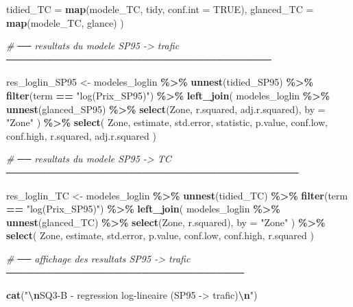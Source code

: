 \documentclass[
]{article}
\newenvironment{Shaded}{\begin{snugshade}}{\end{snugshade}}
\newcommand{\AttributeTok}[1]{\textcolor[rgb]{0.13,0.29,0.53}{#1}}
\newcommand{\CommentTok}[1]{\textcolor[rgb]{0.56,0.35,0.01}{\textit{#1}}}
\newcommand{\ConstantTok}[1]{\textcolor[rgb]{0.56,0.35,0.01}{#1}}
\newcommand{\FunctionTok}[1]{\textcolor[rgb]{0.13,0.29,0.53}{\textbf{#1}}}
\newcommand{\NormalTok}[1]{#1}
\newcommand{\OtherTok}[1]{\textcolor[rgb]{0.56,0.35,0.01}{#1}}
\newcommand{\SpecialCharTok}[1]{\textcolor[rgb]{0.81,0.36,0.00}{\textbf{#1}}}
\newcommand{\StringTok}[1]{\textcolor[rgb]{0.31,0.60,0.02}{#1}}
\begin{document}
\begin{Shaded}
\begin{Highlighting}[]
    \AttributeTok{tidied\_TC  =} \FunctionTok{map}\NormalTok{(modele\_TC, tidy, }\AttributeTok{conf.int =} \ConstantTok{TRUE}\NormalTok{),}
    \AttributeTok{glanced\_TC =} \FunctionTok{map}\NormalTok{(modele\_TC, glance)}
\NormalTok{  )}


\CommentTok{\# ── resultats du modele SP95 {-}\textgreater{} trafic ───────────────────────────────────────}

\NormalTok{res\_loglin\_SP95 }\OtherTok{\textless{}{-}}\NormalTok{ modeles\_loglin }\SpecialCharTok{\%\textgreater{}\%}
  \FunctionTok{unnest}\NormalTok{(tidied\_SP95) }\SpecialCharTok{\%\textgreater{}\%}
  \FunctionTok{filter}\NormalTok{(term }\SpecialCharTok{==} \StringTok{"log(Prix\_SP95)"}\NormalTok{) }\SpecialCharTok{\%\textgreater{}\%}
  \FunctionTok{left\_join}\NormalTok{(}
\NormalTok{    modeles\_loglin }\SpecialCharTok{\%\textgreater{}\%}
      \FunctionTok{unnest}\NormalTok{(glanced\_SP95) }\SpecialCharTok{\%\textgreater{}\%}
      \FunctionTok{select}\NormalTok{(Zone, r.squared, adj.r.squared),}
    \AttributeTok{by =} \StringTok{"Zone"}
\NormalTok{  ) }\SpecialCharTok{\%\textgreater{}\%}
  \FunctionTok{select}\NormalTok{(}
\NormalTok{    Zone, estimate, std.error, statistic, p.value,}
\NormalTok{    conf.low, conf.high, r.squared, adj.r.squared}
\NormalTok{  )}


\CommentTok{\# ── resultats du modele SP95 {-}\textgreater{} TC ───────────────────────────────────────────}

\NormalTok{res\_loglin\_TC }\OtherTok{\textless{}{-}}\NormalTok{ modeles\_loglin }\SpecialCharTok{\%\textgreater{}\%}
  \FunctionTok{unnest}\NormalTok{(tidied\_TC) }\SpecialCharTok{\%\textgreater{}\%}
  \FunctionTok{filter}\NormalTok{(term }\SpecialCharTok{==} \StringTok{"log(Prix\_SP95)"}\NormalTok{) }\SpecialCharTok{\%\textgreater{}\%}
  \FunctionTok{left\_join}\NormalTok{(}
\NormalTok{    modeles\_loglin }\SpecialCharTok{\%\textgreater{}\%}
      \FunctionTok{unnest}\NormalTok{(glanced\_TC) }\SpecialCharTok{\%\textgreater{}\%}
      \FunctionTok{select}\NormalTok{(Zone, r.squared),}
    \AttributeTok{by =} \StringTok{"Zone"}
\NormalTok{  ) }\SpecialCharTok{\%\textgreater{}\%}
  \FunctionTok{select}\NormalTok{(}
\NormalTok{    Zone, estimate, std.error, p.value,}
\NormalTok{    conf.low, conf.high, r.squared}
\NormalTok{  )}


\CommentTok{\# ── affichage des resultats SP95 {-}\textgreater{} trafic ───────────────────────────────────}

\FunctionTok{cat}\NormalTok{(}\StringTok{"}\SpecialCharTok{\textbackslash{}n}\StringTok{SQ3{-}B {-} regression log{-}lineaire (SP95 {-}\textgreater{} trafic)}\SpecialCharTok{\textbackslash{}n}\StringTok{"}\NormalTok{)}
\end{Highlighting}
\end{Shaded}
\end{document}
